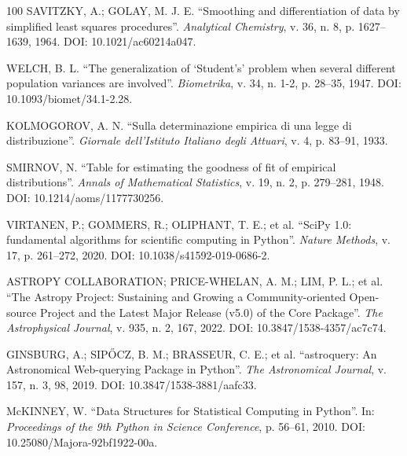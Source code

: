 \documentclass[msc]{on} %
\begin{document}
\begin{thebibliography}{100}
 SAVITZKY, A.; GOLAY, M. J. E. ``Smoothing and differentiation of data by simplified least squares procedures''. \emph{Analytical Chemistry}, v. 36, n. 8, p. 1627--1639, 1964. DOI: 10.1021/ac60214a047.

 WELCH, B. L. ``The generalization of `Student's' problem when several different population variances are involved''. \emph{Biometrika}, v. 34, n. 1-2, p. 28--35, 1947. DOI: 10.1093/biomet/34.1-2.28.

 KOLMOGOROV, A. N. ``Sulla determinazione empirica di una legge di distribuzione''. \emph{Giornale dell'Istituto Italiano degli Attuari}, v. 4, p. 83--91, 1933.

 SMIRNOV, N. ``Table for estimating the goodness of fit of empirical distributions''. \emph{Annals of Mathematical Statistics}, v. 19, n. 2, p. 279--281, 1948. DOI: 10.1214/aoms/1177730256.

 VIRTANEN, P.; GOMMERS, R.; OLIPHANT, T. E.; et al. ``SciPy 1.0: fundamental algorithms for scientific computing in Python''. \emph{Nature Methods}, v. 17, p. 261--272, 2020. DOI: 10.1038/s41592-019-0686-2.

 ASTROPY COLLABORATION; PRICE-WHELAN, A. M.; LIM, P. L.; et al. ``The Astropy Project: Sustaining and Growing a Community-oriented Open-source Project and the Latest Major Release (v5.0) of the Core Package''. \emph{The Astrophysical Journal}, v. 935, n. 2, 167, 2022. DOI: 10.3847/1538-4357/ac7c74.

 GINSBURG, A.; SIP\H{O}CZ, B. M.; BRASSEUR, C. E.; et al. ``astroquery: An Astronomical Web-querying Package in Python''. \emph{The Astronomical Journal}, v. 157, n. 3, 98, 2019. DOI: 10.3847/1538-3881/aafc33.

 McKINNEY, W. ``Data Structures for Statistical Computing in Python''. In: \emph{Proceedings of the 9th Python in Science Conference}, p. 56--61, 2010. DOI: 10.25080/Majora-92bf1922-00a.

%
\end{thebibliography}
\end{document}

